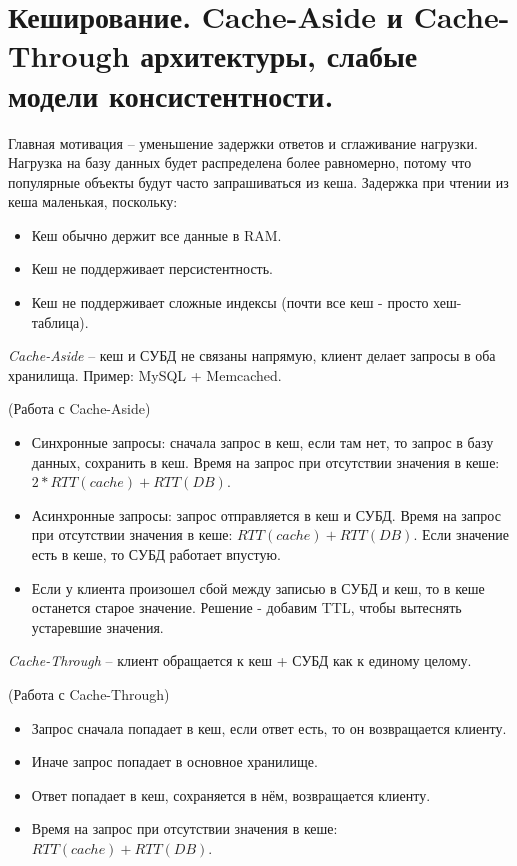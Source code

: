 \section{Кеширование. Cache-Aside и Cache-Through архитектуры, слабые модели консистентности.}

Главная мотивация -- уменьшение задержки ответов и сглаживание нагрузки.
Нагрузка на базу данных будет распределена более равномерно, потому что популярные объекты будут часто запрашиваться из кеша.
Задержка при чтении из кеша маленькая, поскольку:
\begin{itemize}
    \item Кеш обычно держит все данные в RAM.
    \item Кеш не поддерживает персистентность.
    \item Кеш не поддерживает сложные индексы (почти все кеш - просто хеш-таблица).
\end{itemize}

\begin{definition}
    \textit{Cache-Aside} -- кеш и СУБД не связаны напрямую, клиент делает запросы в оба хранилища. Пример: MySQL + Memcached.
\end{definition}

\begin{algorithm}(Работа с Cache-Aside)
    \begin{itemize}
        \item Синхронные запросы: сначала запрос в кеш, если там нет, то запрос в базу данных, сохранить в кеш.
            Время на запрос при отсутствии значения в кеше: $2 * RTT(cache) + RTT(DB)$.
        \item Асинхронные запросы: запрос отправляется в кеш и СУБД.
            Время на запрос при отсутствии значения в кеше: $RTT(cache) + RTT(DB)$.
            Если значение есть в кеше, то СУБД работает впустую.
        \item Если у клиента произошел сбой между записью в СУБД и кеш, то в кеше останется старое значение.
            Решение - добавим TTL, чтобы вытеснять устаревшие значения.
    \end{itemize}
\end{algorithm}

\begin{definition}
    \textit{Cache-Through} -- клиент обращается к кеш + СУБД как к единому целому.
\end{definition}

\begin{algorithm}(Работа с Cache-Through)
    \begin{itemize}
        \item Запрос сначала попадает в кеш, если ответ есть, то он возвращается клиенту.
        \item Иначе запрос попадает в основное хранилище.
        \item Ответ попадает в кеш, сохраняется в нём, возвращается клиенту.
        \item Время на запрос при отсутствии значения в кеше: $RTT(cache) + RTT(DB)$.
    \end{itemize}
\end{algorithm}

